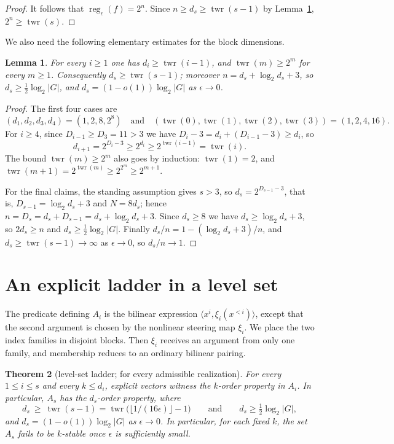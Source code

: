 \documentclass[11pt]{article}
\theoremstyle{plain}
\newtheorem{theorem}{Theorem}
\newtheorem{lemma}[theorem]{Lemma}
\theoremstyle{definition}
\numberwithin{theorem}{section}
\newcommand{\inner}[2]{\langle #1,#2\rangle}
\newcommand{\abs}[1]{\lvert #1\rvert}
\newcommand{\half}{\tfrac12}
\newcommand{\twr}{\operatorname{twr}}
\newcommand{\reg}{\operatorname{reg}}
\begin{document}
\begin{proof}
It follows that $\reg_\epsilon(f)=2^n$. Since
$n\ge d_s\ge\twr(s-1)$ by Lemma~\ref{lem:blockgrowth},
$2^n\ge\twr(s)$.
\end{proof}

We also need the following elementary estimates for the block dimensions.

\begin{lemma}\label{lem:blockgrowth}
For every $i\ge1$ one has $d_i\ge\twr(i-1)$, and $\twr(m)\ge2^{m}$ for every
$m\ge1$. Consequently $d_s\ge\twr(s-1)$; moreover $n=d_s+\log_2 d_s+3$, so
$d_s\ge\half\log_2\abs{G}$, and $d_s=(1-o(1))\log_2\abs{G}$ as $\epsilon\to0$.
\end{lemma}

\begin{proof}
The first four cases are
\[
  (d_1,d_2,d_3,d_4)=(1,2,8,2^8)
  \quad\text{and}\quad
  (\twr(0),\twr(1),\twr(2),\twr(3))=(1,2,4,16).
\]
For $i\ge4$, since $D_{i-1}\ge D_3=11>3$
we have $D_i-3=d_i+(D_{i-1}-3)\ge d_i$, so
\[
  d_{i+1}=2^{D_i-3}\ge 2^{d_i}\ge 2^{\twr(i-1)}=\twr(i).
\]
The bound $\twr(m)\ge2^m$ also goes by induction: $\twr(1)=2$, and
$\twr(m+1)=2^{\twr(m)}\ge2^{2^m}\ge2^{m+1}$.

For the final claims, the standing assumption gives $s>3$, so
$d_s=2^{D_{s-1}-3}$, that is, $D_{s-1}=\log_2 d_s+3$ and $N=8d_s$; hence
$n=D_s=d_s+D_{s-1}=d_s+\log_2 d_s+3$. Since $d_s\ge 8$ we have
$d_s\ge\log_2 d_s+3$, so $2d_s\ge n$ and $d_s\ge\half\log_2\abs{G}$. Finally
$d_s/n=1-(\log_2 d_s+3)/n$, and $d_s\ge\twr(s-1)\to\infty$ as $\epsilon\to0$,
so $d_s/n\to1$.
\end{proof}



\section{An explicit ladder in a level set}\label{sec:levelset}

The predicate defining $A_i$ is the bilinear expression
$\inner{x^i}{\xi_i(x^{<i})}$, except that the second argument is chosen by the
nonlinear steering map $\xi_i$. We place the two index families in disjoint
blocks. Then $\xi_i$ receives an argument from only one family, and membership
reduces to an ordinary bilinear pairing.

\begin{theorem}[level-set ladder; for every admissible realization]\label{thm:levelset}
For every $1\le i\le s$ and every $k\le d_i$, explicit vectors witness
the $k$-order property in $A_i$. In particular, $A_s$ has the $d_s$-order
property, where
\[
  d_s\ \ge\ \twr(s-1)=\twr\bigl(\lfloor 1/(16\epsilon)\rfloor-1\bigr)
  \qquad\text{and}\qquad d_s\ge\half\log_2\abs{G},
\]
and $d_s=(1-o(1))\log_2\abs{G}$ as $\epsilon\to0$.  In particular, for each
fixed $k$, the set $A_s$ fails to be $k$-stable once $\epsilon$ is
sufficiently small.
\end{theorem}
\end{document}
